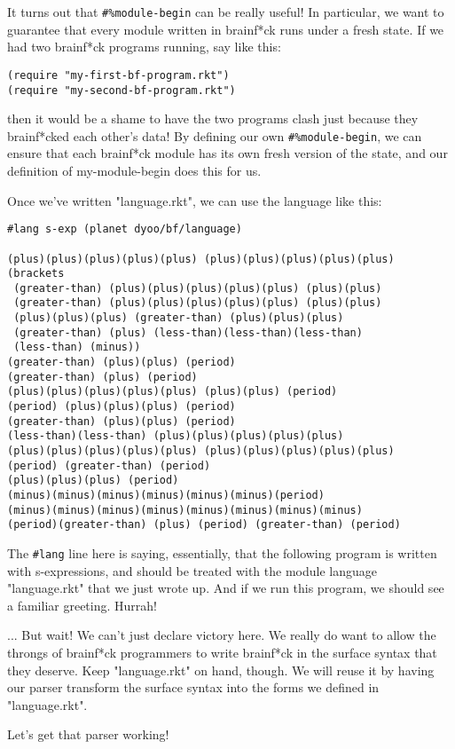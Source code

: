 \documentclass{article}
\begin{document}
It turns out that \verb+#%module-begin+ can be really useful! In particular, we want to guarantee that every module written in brainf*ck runs under a fresh state. If we had two brainf*ck programs running, say like this:
\begin{verbatim}
(require "my-first-bf-program.rkt")
(require "my-second-bf-program.rkt")
\end{verbatim}
then it would be a shame to have the two programs clash just because they brainf*cked each other's data! By defining our own \verb+#%module-begin+, we can ensure that each brainf*ck module has its own fresh version of the state, and our definition of my-module-begin does this for us.


Once we've written "language.rkt", we can use the language like this:
\begin{verbatim}
#lang s-exp (planet dyoo/bf/language)
 
(plus)(plus)(plus)(plus)(plus) (plus)(plus)(plus)(plus)(plus)
(brackets
 (greater-than) (plus)(plus)(plus)(plus)(plus) (plus)(plus)
 (greater-than) (plus)(plus)(plus)(plus)(plus) (plus)(plus)
 (plus)(plus)(plus) (greater-than) (plus)(plus)(plus)
 (greater-than) (plus) (less-than)(less-than)(less-than)
 (less-than) (minus))
(greater-than) (plus)(plus) (period)
(greater-than) (plus) (period)
(plus)(plus)(plus)(plus)(plus) (plus)(plus) (period)
(period) (plus)(plus)(plus) (period)
(greater-than) (plus)(plus) (period)
(less-than)(less-than) (plus)(plus)(plus)(plus)(plus)
(plus)(plus)(plus)(plus)(plus) (plus)(plus)(plus)(plus)(plus)
(period) (greater-than) (period)
(plus)(plus)(plus) (period)
(minus)(minus)(minus)(minus)(minus)(minus)(period)
(minus)(minus)(minus)(minus)(minus)(minus)(minus)(minus)
(period)(greater-than) (plus) (period) (greater-than) (period)
\end{verbatim}
The \verb+#lang+ line here is saying, essentially, that the following program is written with s-expressions, and should be treated with the module language "language.rkt" that we just wrote up. And if we run this program, we should see a familiar greeting. Hurrah!

... But wait! We can't just declare victory here. We really do want to allow the throngs of brainf*ck programmers to write brainf*ck in the surface syntax that they deserve. Keep "language.rkt" on hand, though. We will reuse it by having our parser transform the surface syntax into the forms we defined in "language.rkt".

Let's get that parser working!
\end{document}
